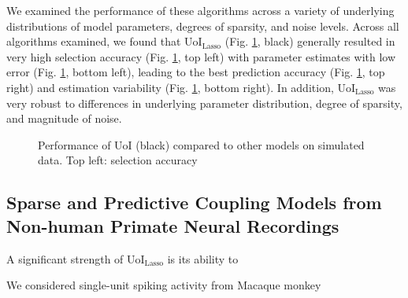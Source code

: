 \documentclass[letterpaper, 10 pt, conference]{ieeeconf}  %
\begin{document}
We examined the performance of these algorithms across a variety of underlying distributions of model parameters, degrees of sparsity, and noise levels. Across all algorithms examined, we found that UoI$_{\text{Lasso}}$ (Fig. \ref{fig:simulated}, black) generally resulted in very high selection accuracy (Fig. \ref{fig:simulated}, top left) with parameter estimates with low error (Fig. \ref{fig:simulated}, bottom left), leading to the best prediction accuracy (Fig. \ref{fig:simulated}, top right) and estimation variability (Fig. \ref{fig:simulated}, bottom right). In addition, UoI$_{\text{Lasso}}$ was very robust to differences in underlying parameter distribution, degree of sparsity, and magnitude of noise.

\begin{figure}[t]
    \centering
    \caption{Performance of UoI (black) compared to other models on simulated data. Top left: selection accuracy}
    \label{fig:simulated}
\end{figure}

\subsection{Sparse and Predictive Coupling Models from Non-human Primate Neural Recordings}
A significant strength of UoI$_{\text{Lasso}}$ is its ability to 

We considered single-unit spiking activity from Macaque monkey 
\end{document}
